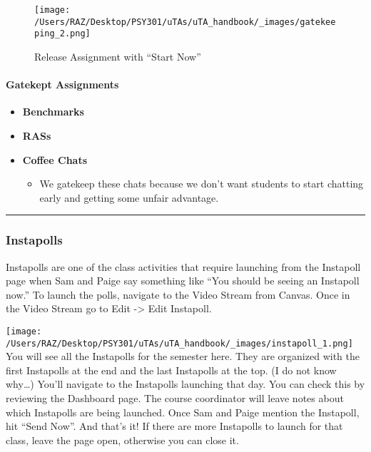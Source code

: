\documentclass[
]{article}
\providecommand{\tightlist}{%
  \setlength{\itemsep}{0pt}\setlength{\parskip}{0pt}}
\begin{document}
\begin{figure}
\centering
\texttt{[image: /Users/RAZ/Desktop/PSY301/uTAs/uTA\_handbook/\_images/gatekeeping\_2.png]}
\caption{Release Assignment with ``Start Now''}
\end{figure}

\hypertarget{gatekept-assignments}{%
\paragraph{Gatekept Assignments}\label{gatekept-assignments}}

\begin{itemize}
\tightlist
\item
  \textbf{Benchmarks}
\item
  \textbf{RASs}
\item
  \textbf{Coffee Chats}

  \begin{itemize}
  \tightlist
  \item
    We gatekeep these chats because we don't want students to start chatting early and getting some unfair advantage.
  \end{itemize}
\end{itemize}

\begin{center}\rule{0.5\linewidth}{0.5pt}\end{center}

\hypertarget{instapolls}{%
\subsubsection{Instapolls}\label{instapolls}}

Instapolls are one of the class activities that require launching from the Instapoll page when Sam and Paige say something like ``You should be seeing an Instapoll now.'' To launch the polls, navigate to the Video Stream from Canvas. Once in the Video Stream go to Edit -\textgreater{} Edit Instapoll.

\texttt{[image: /Users/RAZ/Desktop/PSY301/uTAs/uTA\_handbook/\_images/instapoll\_1.png]}
You will see all the Instapolls for the semester here. They are organized with the first Instapolls at the end and the last Instapolls at the top. (I do not know why\ldots) You'll navigate to the Instapolls launching that day. You can check this by reviewing the Dashboard page. The course coordinator will leave notes about which Instapolls are being launched. Once Sam and Paige mention the Instapoll, hit ``Send Now''. And that's it! If there are more Instapolls to launch for that class, leave the page open, otherwise you can close it.
\end{document}
